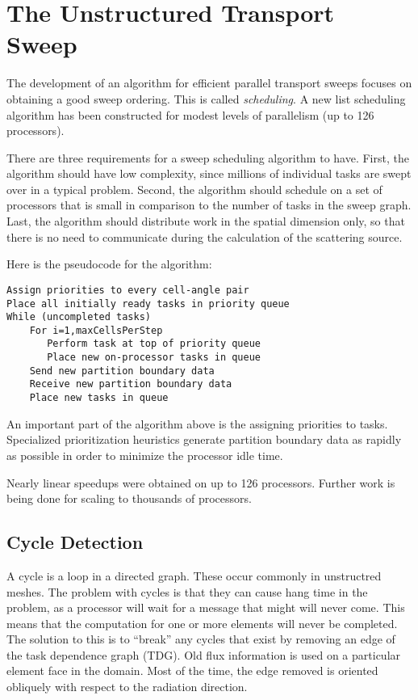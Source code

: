 \documentclass[11pt, letterpaper,titlepage,oneside]{article}
\begin{document}
\section*{The Unstructured Transport Sweep}

The development of an algorithm for efficient parallel transport sweeps focuses on obtaining a good sweep ordering. This is called \textit{scheduling}. A new list scheduling algorithm has been constructed for modest levels of parallelism (up to 126 processors).

There are three requirements for a sweep scheduling algorithm to have. First, the algorithm should have low complexity, since millions of individual tasks are swept over in a typical problem. Second, the algorithm should schedule on a set of processors that is small in comparison to the number of tasks in the sweep graph. Last, the algorithm should distribute work in the spatial dimension only, so that there is no need to communicate during the calculation of the scattering source. 

Here is the pseudocode for the algorithm:

\begin{verbatim}
Assign priorities to every cell-angle pair
Place all initially ready tasks in priority queue
While (uncompleted tasks)
    For i=1,maxCellsPerStep
       Perform task at top of priority queue
       Place new on-processor tasks in queue
    Send new partition boundary data
    Receive new partition boundary data
    Place new tasks in queue 
\end{verbatim}

An important part of the algorithm above is the assigning priorities to tasks. Specialized prioritization heuristics generate partition boundary data as rapidly as possible in order to minimize the processor idle time. 

Nearly linear speedups were obtained on up to 126 processors. Further work is being done for scaling to thousands of processors. 

\subsection*{Cycle Detection}

A cycle is a loop in a directed graph. These occur commonly in unstructred meshes. The problem with cycles is that they can cause hang time in the problem, as a processor will wait for a message that might will never come. This means that the computation for one or more elements will never be completed. The solution to this is to ``break'' any cycles that exist by removing an edge of the task dependence graph (TDG). Old flux information is used on a particular element face in the domain. Most of the time, the edge removed is oriented obliquely with respect to the radiation direction. 
\end{document}
